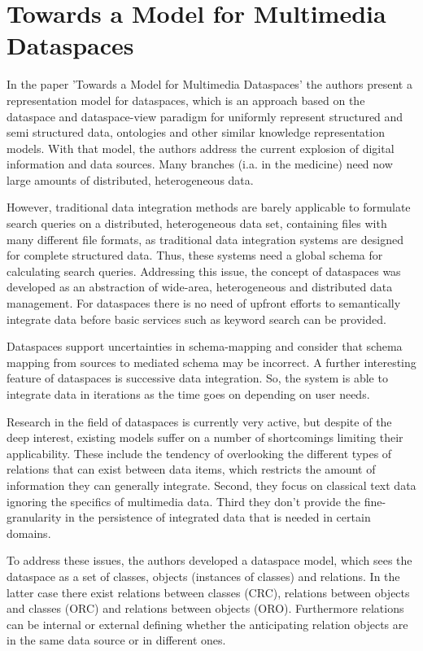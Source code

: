 \section{Towards a Model for Multimedia Dataspaces}

In the paper 'Towards a Model for Multimedia Dataspaces'\cite{6167826} the authors present a representation model for dataspaces, which is an approach based on the dataspace and dataspace-view paradigm for uniformly represent  structured and semi structured data, ontologies and other similar knowledge representation models. 
With that model, the authors address the current explosion of digital information and data sources. Many branches (i.a. in the medicine) need now large amounts of distributed, heterogeneous data. 

However, traditional data integration methods are barely applicable to formulate search queries on a distributed,  heterogeneous data set, containing files with many different file formats, as traditional data integration systems are designed for complete structured data.
Thus, these systems need a global schema for calculating search queries. 
Addressing this issue, the concept of dataspaces was developed as an abstraction of wide-area, heterogeneous and distributed data management.
For dataspaces there is no need of upfront efforts to semantically integrate data before basic services such as keyword search can be provided. 

Dataspaces support uncertainties in schema-mapping and consider that schema mapping from sources to  mediated schema may be incorrect.
A further interesting feature of dataspaces is successive data integration. So, the system is able to  integrate data in iterations as the time goes on depending on user needs.

Research in the field of dataspaces is currently very active, but despite of the deep interest, existing models suffer on a number of shortcomings limiting their applicability.
These include the tendency of overlooking the different types of relations that can exist between data items, which restricts the amount of information they can generally integrate.
Second, they focus on classical text data ignoring the specifics of multimedia data. Third they don't provide the fine-granularity in the persistence of integrated data that is needed in certain domains.

To address these issues, the authors developed a dataspace model, which sees the dataspace as a set of classes, objects (instances of classes) and relations.
In the latter case there exist relations between classes (CRC), relations between objects and classes (ORC) and relations between objects (ORO).
Furthermore relations can be internal or external defining whether the anticipating relation objects are in the same data source or in different ones.

